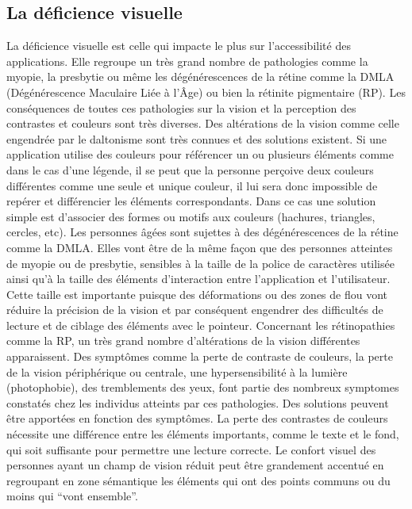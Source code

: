 \documentclass[french,a4paper]{report}
\begin{document}
\subsection{La déficience visuelle}
La déficience visuelle est celle qui impacte le plus sur l'accessibilité des applications. Elle regroupe un très grand nombre de pathologies comme la myopie, la presbytie ou même les dégénérescences de la rétine comme la DMLA (Dégénérescence Maculaire Liée à l'Âge) ou bien la rétinite pigmentaire (RP).
Les conséquences de toutes ces pathologies sur la vision et la perception des contrastes et couleurs sont très diverses.
\newline
Des altérations de la vision comme celle engendrée par le daltonisme sont très connues et des solutions existent. Si une application utilise des couleurs pour référencer un ou plusieurs éléments comme dans le cas d'une légende, il se peut que la personne perçoive deux couleurs différentes comme une seule et unique couleur, il lui sera donc impossible de repérer et différencier les éléments correspondants. Dans ce cas une solution simple est d'associer des formes ou motifs aux couleurs (hachures, triangles, cercles, etc).
\newline
Les personnes âgées sont sujettes à des dégénérescences de la rétine comme la
DMLA. Elles vont être de la même façon que des personnes atteintes de myopie ou de presbytie, sensibles à la taille de la police de caractères utilisée ainsi qu'à la taille des éléments d'interaction entre l'application et l'utilisateur.
Cette taille est importante puisque des déformations ou des zones de flou vont réduire la précision de la vision et par conséquent engendrer des difficultés de lecture et de ciblage des éléments avec le pointeur.
\newline
Concernant les rétinopathies comme la RP, un très grand nombre d'altérations de la vision différentes apparaissent. Des symptômes comme la perte de contraste de couleurs, la perte de la vision périphérique ou centrale, une hypersensibilité à la lumière (photophobie), des tremblements des yeux, font partie des nombreux \glspl{symptome} constatés chez les individus atteints par ces pathologies.
Des solutions peuvent être apportées en fonction des symptômes.
\newline
La perte des contrastes de couleurs nécessite une différence entre les éléments importants, comme le texte et le fond, qui soit suffisante pour permettre une lecture correcte.
\newline
Le confort visuel des personnes ayant un champ de vision réduit peut être grandement accentué en regroupant en zone sémantique les éléments qui ont des points communs ou du moins qui \enquote{vont ensemble}.
\end{document}
